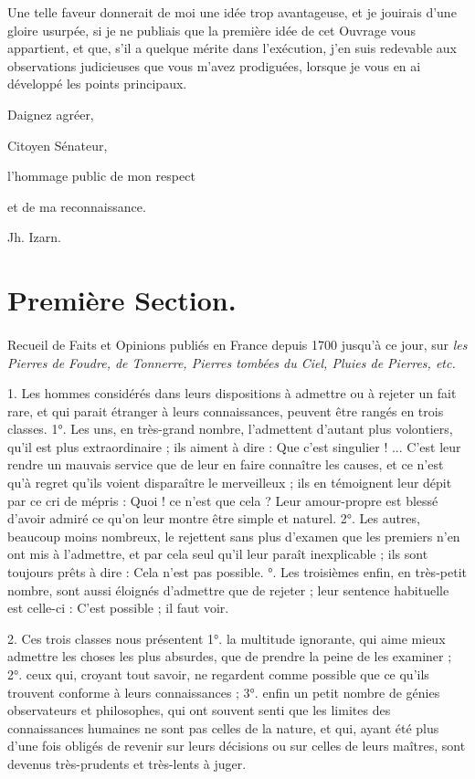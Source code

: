 \documentclass[a4paper, 11pt, oneside, polutonikogreek, french]{article}
\begin{document}
Une telle faveur donnerait de moi une idée trop avantageuse, et je jouirais d'une gloire usurpée, si je ne publiais que la première idée de cet Ouvrage vous appartient, et que, s'il a quelque mérite dans l'exécution, j'en suis redevable aux observations judicieuses que vous m'avez prodiguées, lorsque je vous en ai développé les points principaux.

Daignez agréer,

Citoyen Sénateur,

\bigskip

\hspace*{5mm}l'hommage public de mon respect

\hspace*{5mm}et de ma reconnaissance.

\bigskip

Jh. Izarn.
\clearpage
\section{Première Section.}
\paragraph{}
Recueil de Faits et Opinions publiés en France depuis 1700 jusqu'à ce jour, sur \emph{les Pierres de Foudre, de Tonnerre, Pierres tombées du Ciel, Pluies de Pierres, etc.}

1. Les hommes considérés dans leurs dispositions à admettre ou à rejeter un fait rare, et qui parait étranger à leurs connaissances, peuvent être rangés en trois classes. 1°. Les uns, en très-grand nombre, l'admettent d'autant plus volontiers, qu'il est plus extraordinaire ; ils aiment à dire : \og Que c'est singulier ! ... \fg C'est leur rendre un mauvais service que de leur en faire connaître les causes, et ce n'est qu'à regret qu'ils voient disparaître le merveilleux ; ils en témoignent leur dépit par ce cri de mépris : \og Quoi ! ce n'est que cela ? \fg Leur amour-propre est blessé d'avoir admiré ce qu'on leur montre être simple et naturel. 2°. Les autres, beaucoup moins nombreux, le rejettent sans plus d'examen que les premiers n'en ont mis à l'admettre, et par cela seul qu'il leur paraît inexplicable ; ils sont toujours prêts à dire : \og Cela n'est pas possible. °. Les troisièmes enfin, en très-petit nombre, sont aussi éloignés d'admettre que de rejeter ; leur sentence habituelle est celle-ci : \og C'est possible ; il faut voir. \fg

2. Ces trois classes nous présentent 1°. la multitude ignorante, qui aime mieux admettre les choses les plus absurdes, que de prendre la peine de les examiner ; 2°. ceux qui, croyant tout savoir, ne regardent comme possible que ce qu'ils trouvent conforme à leurs connaissances ; 3°. enfin un petit nombre de génies observateurs et philosophes, qui ont souvent senti que les limites des connaissances humaines ne sont pas celles de la nature, et qui, ayant été plus d'une fois obligés de revenir sur leurs décisions ou sur celles de leurs maîtres, sont devenus très-prudents et très-lents à juger.
\end{document}

